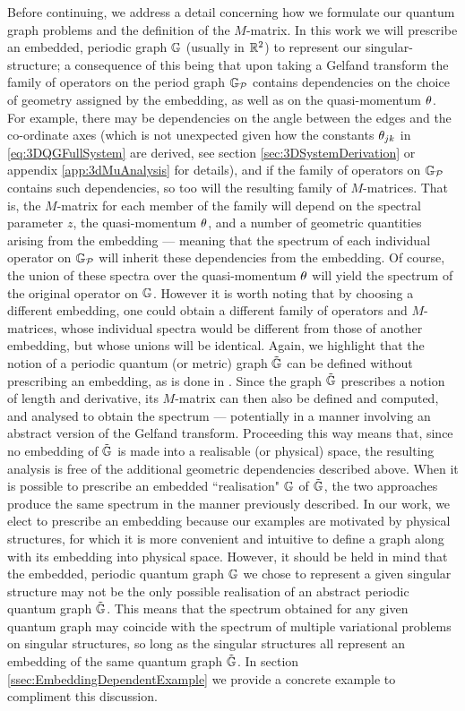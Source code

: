 Before continuing, we address a detail concerning how we formulate our quantum graph problems and the definition of the $M$-matrix.
In this work we will prescribe an embedded, periodic graph $\mathbb{G}$ (usually in $\mathbb{R}^2$) to represent our singular-structure; a consequence of this being that upon taking a Gelfand transform the family of operators on the period graph $\mathbb{G}_{\mathcal{P}}$ contains dependencies on the choice of geometry assigned by the embedding, as well as on the quasi-momentum $\theta$.
For example, there may be dependencies on the angle between the edges and the co-ordinate axes (which is not unexpected given how the constants $\theta_{jk}$ in \eqref{eq:3DQGFullSystem} are derived, see section \ref{sec:3DSystemDerivation} or appendix \ref{app:3dMuAnalysis} for details), and if the family of operators on $\mathbb{G}_{\mathcal{P}}$ contains such dependencies, so too will the resulting family of $M$-matrices.
That is, the $M$-matrix for each member of the family will depend on the spectral parameter $z$, the quasi-momentum $\theta$, and a number of geometric quantities arising from the embedding --- meaning that the spectrum of each individual operator on $\mathbb{G}_{\mathcal{P}}$ will inherit these dependencies from the embedding.
Of course, the union of these spectra over the quasi-momentum $\theta$ will yield the spectrum of the original operator on $\mathbb{G}$.
However it is worth noting that by choosing a different embedding, one could obtain a different family of operators and $M$-matrices, whose individual spectra would be different from those of another embedding, but whose unions will be identical.
Again, we highlight that the notion of a periodic quantum (or metric) graph $\tilde{\mathbb{G}}$ can be defined without prescribing an embedding, as is done in \cite[Chapter~4]{berkolaiko2013introduction}.
Since the graph $\tilde{\mathbb{G}}$ prescribes a notion of length and derivative, its $M$-matrix can then also be defined and computed, and analysed to obtain the spectrum --- potentially in a manner involving an abstract version of the Gelfand transform.
Proceeding this way means that, since no embedding of $\tilde{\mathbb{G}}$ is made into a realisable (or physical) space, the resulting analysis is free of the additional geometric dependencies described above.
When it is possible to prescribe an embedded ``realisation" $\mathbb{G}$ of $\tilde{\mathbb{G}}$, the two approaches produce the same spectrum in the manner previously described.
In our work, we elect to prescribe an embedding because our examples are motivated by physical structures, for which it is more convenient and intuitive to define a graph along with its embedding into physical space.
However, it should be held in mind that the embedded, periodic quantum graph $\mathbb{G}$ we chose to represent a given singular structure may not be the only possible realisation of an abstract periodic quantum graph $\tilde{\mathbb{G}}$.
This means that the spectrum obtained for any given quantum graph may coincide with the spectrum of multiple variational problems on singular structures, so long as the singular structures all represent an embedding of the same quantum graph $\tilde{\mathbb{G}}$.
In section \ref{ssec:EmbeddingDependentExample} we provide a concrete example to compliment this discussion.